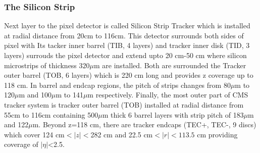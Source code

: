 \subsubsection{The Silicon Strip}
Next layer to the pixel detector is called Silicon Strip Tracker which is installed at radial distance  from 20cm to 116cm.  
This detector surrounds both sides of pixel with Its tacker inner barrel (TIB, 4 layers) and  tracker inner disk (TID, 3 layers) surrouds the pixel detector and extend upto 20 cm-50 cm where silicon microstrips of thickness $320\mu$m are installed.
Both are surrounded the Tracker outer barrel (TOB, 6 layers) which is 220 cm long and provides z coverage up to 118 cm. 
In barrel and endcap regions, the pitch of strips changes from 80$\mu$m to 120$\mu$m and 100$\mu$m to 141$\mu$m respectively.
Finally, the most outer part of CMS tracker system  is tracker outer barrel (TOB) installed at radial distance from 55cm to 116cm containing 500$\mu$m thick 6 barrel layers with strip pitch of 183$\mu$m and 122$\mu$m. 
Beyond z=118 cm, there are tracker endcaps (TEC+, TEC-, 9 discs) which cover 124 cm$<|z|<$282 cm and 22.5 cm$<|r|<113.5$ cm providing coverage of $|\eta|$<2.5.

